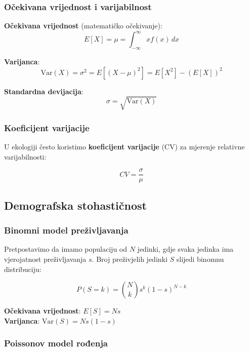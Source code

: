 \documentclass[11pt,oneside]{book}
\begin{document}
\subsubsection{Očekivana vrijednost i varijabilnost}

\textbf{Očekivana vrijednost} (matematičko očekivanje):
\begin{equation}
	E[X] = \mu = \int_{-\infty}^{\infty} x f(x) \, dx
\end{equation}

\textbf{Varijanca}:
\begin{equation}
	\text{Var}(X) = \sigma^2 = E[(X - \mu)^2] = E[X^2] - (E[X])^2
\end{equation}

\textbf{Standardna devijacija}:
\begin{equation}
	\sigma = \sqrt{\text{Var}(X)}
\end{equation}

\subsubsection{Koeficijent varijacije}

U ekologiji često koristimo \textbf{koeficijent varijacije} (CV) za mjerenje relativne varijabilnosti:

\begin{equation}
	CV = \frac{\sigma}{\mu}
\end{equation}

\subsection{Demografska stohastičnost}

\subsubsection{Binomni model preživljavanja}

Pretpostavimo da imamo populaciju od $N$ jedinki, gdje svaka jedinka ima vjerojatnost preživljavanja $s$. Broj preživjelih jedinki $S$ slijedi binomnu distribuciju:

\begin{equation}
	P(S = k) = \binom{N}{k} s^k (1-s)^{N-k}
\end{equation}

\textbf{Očekivana vrijednost}: $E[S] = Ns$\\
\textbf{Varijanca}: $\text{Var}(S) = Ns(1-s)$

\subsubsection{Poissonov model rođenja}
\end{document}
